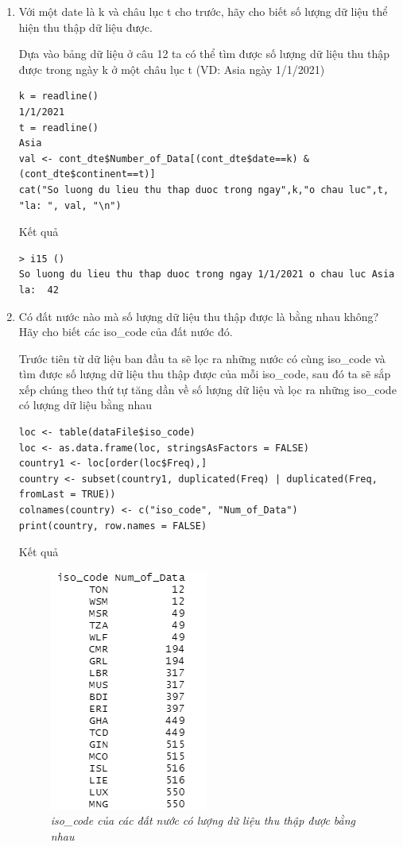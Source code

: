 \documentclass[a4paper]{article}
\theoremstyle{definition}
\begin{document}
\begin{enumerate}[1)]
\item Với một date là k và châu lục t cho trước, hãy cho biết số lượng dữ liệu thể hiện thu thập dữ liệu được. 

Dựa vào bảng dữ liệu ở câu 12 ta có thể tìm được số lượng dữ liệu thu thập được trong ngày k ở một châu lục t (VD: Asia ngày 1/1/2021)
\begin{lstlisting}
k = readline()
1/1/2021
t = readline()
Asia
val <- cont_dte$Number_of_Data[(cont_dte$date==k) & (cont_dte$continent==t)]
cat("So luong du lieu thu thap duoc trong ngay",k,"o chau luc",t, "la: ", val, "\n")
\end{lstlisting}
Kết quả
\begin{lstlisting}
> i15 ()
So luong du lieu thu thap duoc trong ngay 1/1/2021 o chau luc Asia la:  42
\end{lstlisting}

\item Có đất nước nào mà số lượng dữ liệu thu thập được là bằng nhau không? Hãy cho biết các iso\_code của đất nước đó. 

Trước tiên từ dữ liệu ban đầu ta sẽ lọc ra những nước có cùng iso\_code và tìm được số lượng dữ liệu thu thập được của mỗi iso\_code, sau đó ta sẽ sắp xếp chúng theo thứ tự tăng dần về số lượng dữ liệu và lọc ra những iso\_code có lượng dữ liệu bằng nhau
\begin{lstlisting}
loc <- table(dataFile$iso_code)
loc <- as.data.frame(loc, stringsAsFactors = FALSE)
country1 <- loc[order(loc$Freq),]
country <- subset(country1, duplicated(Freq) | duplicated(Freq, fromLast = TRUE))
colnames(country) <- c("iso_code", "Num_of_Data")
print(country, row.names = FALSE)
\end{lstlisting}
Kết quả
    \begin{figure}[H]
        \begin{center}
            \includegraphics[scale=0.7]{i/i16.png}
        \end{center}
        \vspace{+3mm}\caption{\it iso\_code của các đất nước có lượng dữ liệu thu thập được bằng nhau}
    \end{figure}


\end{enumerate}
\end{document}
